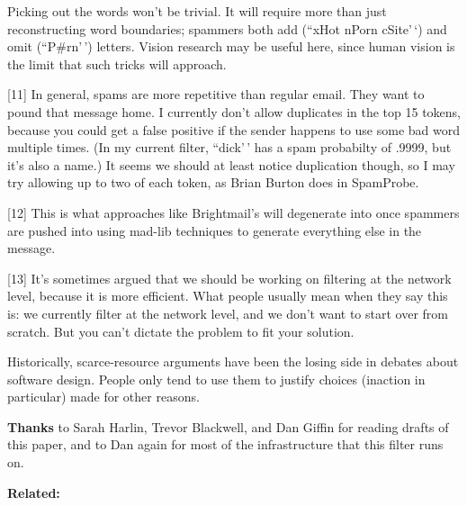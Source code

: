 Picking out the words won't be trivial. It will require more than just
reconstructing word boundaries; spammers both add (``xHot nPorn
cSite'\,`) and omit (``P\#rn'\,') letters. Vision research may be useful
here, since human vision is the limit that such tricks will approach.

{[}11{]} In general, spams are more repetitive than regular email. They
want to pound that message home. I currently don't allow duplicates in
the top 15 tokens, because you could get a false positive if the sender
happens to use some bad word multiple times. (In my current filter,
``dick'\,' has a spam probabilty of .9999, but it's also a name.) It
seems we should at least notice duplication though, so I may try
allowing up to two of each token, as Brian Burton does in SpamProbe.

{[}12{]} This is what approaches like Brightmail's will degenerate into
once spammers are pushed into using mad-lib techniques to generate
everything else in the message.

{[}13{]} It's sometimes argued that we should be working on filtering at
the network level, because it is more efficient. What people usually
mean when they say this is: we currently filter at the network level,
and we don't want to start over from scratch. But you can't dictate the
problem to fit your solution.

Historically, scarce-resource arguments have been the losing side in
debates about software design. People only tend to use them to justify
choices (inaction in particular) made for other reasons.

\textbf{Thanks} to Sarah Harlin, Trevor Blackwell, and Dan Giffin for
reading drafts of this paper, and to Dan again for most of the
infrastructure that this filter runs on.

\textbf{Related:}
